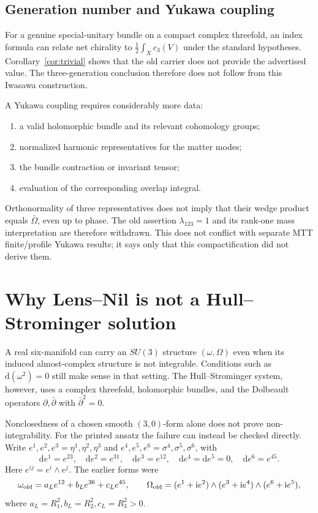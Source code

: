 \documentclass[11pt]{article}
\newcommand{\ii}{\mathrm{i}}
\newcommand{\dd}{\mathrm{d}}
\theoremstyle{definition}
\theoremstyle{remark}
\begin{document}
\subsection{Generation number and Yukawa coupling}

For a genuine special-unitary bundle on a compact complex threefold, an index
formula can relate net chirality to \(\frac12\int_Xc_3(V)\) under the standard
hypotheses.  Corollary~\ref{cor:trivial} shows that the old carrier does not
provide the advertised value.  The three-generation conclusion therefore
does not follow from this Iwasawa construction.

A Yukawa coupling requires considerably more data:
\begin{enumerate}[leftmargin=1.6em]
\item a valid holomorphic bundle and its relevant cohomology groups;
\item normalized harmonic representatives for the matter modes;
\item the bundle contraction or invariant tensor;
\item evaluation of the corresponding overlap integral.
\end{enumerate}
Orthonormality of three representatives does not imply that their wedge
product equals \(\bar\Omega\), even up to phase.  The old assertion
\(\lambda_{123}=1\) and its rank-one mass interpretation are therefore
withdrawn.  This does not conflict with separate MTT finite/profile Yukawa
results; it says only that this compactification did not derive them.

\section{Why Lens--Nil is not a Hull--Strominger solution}
\label{sec:lensnil}

A real six-manifold can carry an \(SU(3)\) structure \((\omega,\Omega)\) even
when its induced almost-complex structure is not integrable.  Conditions such
as \(\dd(\omega^2)=0\) still make sense in that setting.  The
Hull--Strominger system, however, uses a complex threefold, holomorphic
bundles, and the Dolbeault operators \(\partial,\bar\partial\) with
\(\bar\partial^2=0\).

Nonclosedness of a chosen smooth \((3,0)\)-form alone does not prove
non-integrability.  For the printed ansatz the failure can instead be checked
directly.  Write \(e^1,e^2,e^3=\eta^1,\eta^2,\eta^3\) and
\(e^4,e^5,e^6=\sigma^4,\sigma^5,\sigma^6\), with
\[
 \dd e^1=e^{23},\quad \dd e^2=e^{31},\quad \dd e^3=e^{12},
 \quad \dd e^4=\dd e^5=0,\quad \dd e^6=e^{45}.
\]
Here \(e^{ij}=e^i\wedge e^j\).  The earlier forms were
\[
 \omega_{\rm old}=a_L e^{12}+b_L e^{36}+c_L e^{45},\qquad
 \Omega_{\rm old}=(e^1+\ii e^2)\wedge(e^3+\ii e^4)
                     \wedge(e^6+\ii e^5),
\]
where \(a_L=R_1^2,b_L=R_2^2,c_L=R_3^2>0\).
\end{document}
